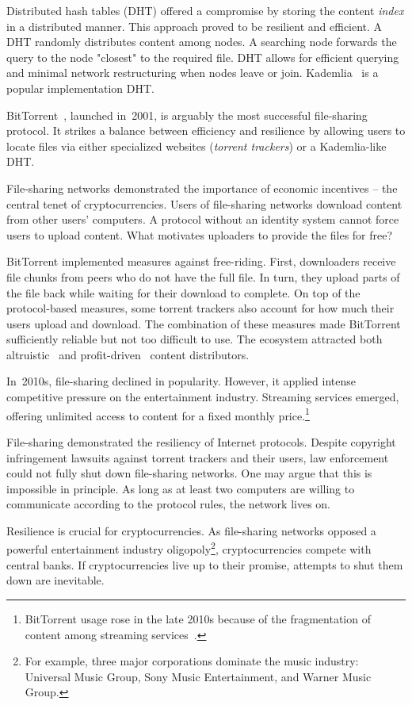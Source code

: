 Distributed hash tables (DHT) offered a compromise by storing the content \textit{index} in a distributed manner.
This approach proved to be resilient and efficient.
A DHT randomly distributes content among nodes.
A searching node forwards the query to the node "closest" to the required file.
DHT allows for efficient querying and minimal network restructuring when nodes leave or join.
Kademlia~\cite{Maymounkov2002} is a popular implementation DHT.

BitTorrent~\cite{Pouwelse2005}, launched in~2001, is arguably the most successful file-sharing protocol.
It strikes a balance between efficiency and resilience by allowing users to locate files via either specialized websites (\textit{torrent trackers}) or a Kademlia-like DHT.

File-sharing networks demonstrated the importance of economic incentives -- the central tenet of cryptocurrencies.
Users of file-sharing networks download content from other users' computers.
A protocol without an identity system cannot force users to upload content.
What motivates uploaders to provide the files for free?

BitTorrent implemented measures against free-riding.
First, downloaders receive file chunks from peers who do not have the full file.
In turn, they upload parts of the file back while waiting for their download to complete.
On top of the protocol-based measures, some torrent trackers also account for how much their users upload and download.
The combination of these measures made BitTorrent sufficiently reliable but not too difficult to use.
The ecosystem attracted both altruistic~\cite{Rehn2004} and profit-driven~\cite{Rumin2010} content distributors.

In~2010s, file-sharing declined in popularity.
However, it applied intense competitive pressure on the entertainment industry.
Streaming services emerged, offering unlimited access to content for a fixed monthly price.\footnote{BitTorrent usage rose in the late 2010s because of the fragmentation of content among streaming services~\cite{Bode2018}.}

File-sharing demonstrated the resiliency of Internet protocols.
Despite copyright infringement lawsuits against torrent trackers and their users, law enforcement could not fully shut down file-sharing networks.
One may argue that this is impossible in principle.
As long as at least two computers are willing to communicate according to the protocol rules, the network lives on.

Resilience is crucial for cryptocurrencies.
As file-sharing networks opposed a powerful entertainment industry oligopoly\footnote{For example, three major corporations dominate the music industry: Universal Music Group, Sony Music Entertainment, and Warner Music Group.}, cryptocurrencies compete with central banks.
If cryptocurrencies live up to their promise, attempts to shut them down are inevitable.


